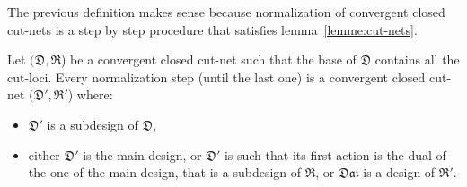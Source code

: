 \documentclass{LMCS}
\newcommand{\design}[1]{{\mathfrak{#1}}}
\newcommand{\dai}{\design{Dai}}
\begin{document}
The previous definition makes sense because normalization of convergent closed cut-nets is a step by step procedure that satisfies lemma~\ref{lemme:cut-nets}.

\begin{lem}\label{lemme:cut-nets}
Let $(\design{D},\design{R}$) be a convergent closed cut-net such that the base of $\design{D}$ contains all the cut-loci.
Every normalization step (until the last one) is a convergent closed
cut-net  $(\design{D}',\design{R}'$) where:
\begin{itemize}[label=$-$]
\item $\design{D}'$ is a subdesign of $\design{D}$,
\item either $\design{D}'$ is the main design, or $\design{D}'$ is
  such that its first action is the dual of the one of the main
  design, that is a subdesign of $\design{R}$, or $\dai$ is a design
  of $\design{R}'$.
\end{itemize}
\end{lem}
\end{document}
